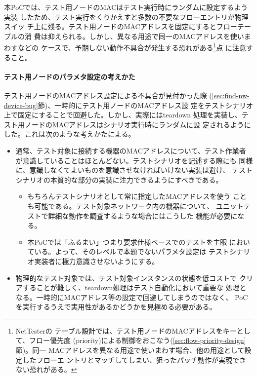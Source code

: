 本PoCでは、テスト用ノードのMACはテスト実行時にランダムに設定するよう実装
したため、テスト実行をくりかえすと多数の不要なフローエントリが物理スイッ
チ上に残る。テスト用ノードのMACアドレスを固定にするとフローテーブルの消
費は抑えられる。しかし、異なる用途で同一のMACアドレスを使いまわすなどの
ケースで、予期しない動作不具合が発生する恐れがある\footnote{NetTesterの
テーブル設計では、テスト用ノードのMACアドレスをキーとして、フロー優先度
(priority)による制御をおこなう(\ref{sec:flow-priority-design}節)。同一
MACアドレスを異なる用途で使いまわす場合、他の用途として設定したフローエ
ントリとマッチしてしまい、狙ったパッチ動作が実現できない恐れがある。}点
に注意すること。

    \paragraph{テスト用ノードのパラメタ設定の考えかた}

テスト用ノードのMACアドレス設定による不具合が見付かった際
(\ref{sec:find-nw-device-bug}節)、一時的にテスト用ノードのMACアドレス設
定をテストシナリオ上で固定にすることで回避した。しかし、実際にはteardown
処理を実装し、テスト用ノードのMACアドレスはシナリオ実行時にランダムに設
定されるようにした。これは次のような考えかたによる。
\begin{itemize}
 \item 通常、テスト対象に接続する機器のMACアドレスについて、テスト作業者
       が意識していることはほとんどない。テストシナリオを記述する際にも
       同様に、意識しなくてよいものを意識させなければいけない実装は避け、
       テストシナリオの本質的な部分の実装に注力できるようにすべきである。
       \begin{itemize}
        \item もちろんテストシナリオとして常に指定したMACアドレスを使う
              ことも可能である。テスト対象ネットワーク内の機器について、
              ユニットテストで詳細な動作を調査するような場合にはこうした
              機能が必要になる。
        \item 本PoCでは「ふるまい」つまり要求仕様ベースでのテストを主眼
              においている。よって、そのレベルで本題でないパラメタ設定は
              テストシナリオ実装者に極力意識させないようにする。
       \end{itemize}
 \item 物理的なテスト対象では、テスト対象インスタンスの状態を低コストで
       クリアすることが難しく、teardown処理はテスト自動化において重要な
       処理となる。一時的にMACアドレス等の設定で回避してしまうのではなく、
       PoCを実行するうえで実用性があるかどうかを見極める必要がある。
\end{itemize}

